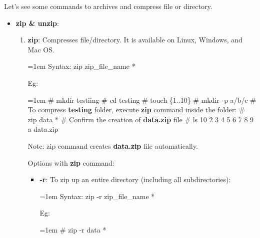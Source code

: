 \setlength{\columnsep}{3pt}
\begin{flushleft}
	Let's see some commands to archives and compress file or directory.
	\begin{itemize}
		\item \textbf{zip \& unzip}: 
		\begin{enumerate}
			\item \textbf{zip}: Compresses file/directory. It is available on Linux, Windows, and Mac OS. 
			\bigskip
			\begin{tcolorbox}[breakable,notitle,boxrule=0pt,colback=pink,colframe=pink]
				\color{black}
				\font=1em
				Syntax: zip zip\_file\_name *
				\font=4pt
			\end{tcolorbox}
			Eg:
			\begin{tcolorbox}[breakable,notitle,boxrule=-0pt,colback=black,colframe=black]
				\color{green}
				\font=1em
				\# mkdir testiing
				\newline
				\# cd testing
				\newline
				\# touch \{1..10\} 
				\newline
				\# mkdir -p a/b/c
				\newline
				\newline
				\color{yellow}
				\# To compress \textbf{testing} folder, execute \textbf{zip} command inside the folder:
				\newline
				\color{green}
				\# zip data *
				\newline
				\newline
				\color{yellow}
				\# Confirm the creation of \textbf{data.zip} file
				\newline
				\color{green}
				\# ls
				\color{white}
				  10  2  3  4  5  6  7  8  9  a  data.zip
				\font=4pt
			\end{tcolorbox}
			
			\bigskip
			\begin{tcolorbox}[breakable,notitle,boxrule=0pt,colback=yellow,colframe=yellow]
				\color{black}
				Note: zip command creates \textbf{data.zip} file automatically.
			\end{tcolorbox}
			
			Options with \textbf{zip} command:
			\begin{itemize}
				\item \textbf{-r}: To zip up an entire directory (including all subdirectories):
				\bigskip
				\begin{tcolorbox}[breakable,notitle,boxrule=0pt,colback=pink,colframe=pink]
					\color{black}
					\font=1em
					Syntax: zip -r zip\_file\_name *
					\font=4pt
				\end{tcolorbox}
				Eg:
				\begin{tcolorbox}[breakable,notitle,boxrule=-0pt,colback=black,colframe=black]
					\color{green}
					\font=1em
					\# zip -r data *
					\font=4pt
				\end{tcolorbox}
				

\end{itemize}
\end{enumerate}
\end{itemize}
\end{flushleft}
